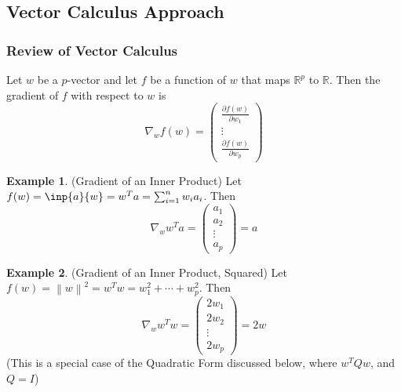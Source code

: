 \documentclass[12pt]{article}
\theoremstyle{definition}
\newtheorem{example}{Example}
\newcommand{\R}{\mathbb{R}}
\newcommand{\norm}[1]{\left\lVert#1\right\rVert}
\begin{document}
\subsection{Vector Calculus Approach}
\subsubsection{Review of Vector Calculus}
Let $w$ be a $p$-vector and let $f$ be a function of $w$ that maps $\R^p$ to $\R$. Then the gradient of $f$ with respect to $w$ is
\begin{equation}
	\nabla_w f(w) = \begin{pmatrix} \frac{\partial f(w)}{\partial w_1} \\ \vdots \\ \frac{\partial f(w)}{\partial w_p} \end{pmatrix}
\end{equation}

\begin{example}(Gradient of an Inner Product)
Let $f(w) = \inp{a}{w} = w^T a = \sum_{i=1}^n w_i a_i$. Then
\begin{equation}
	\nabla_w w^T a = \begin{pmatrix} a_1 \\ a_2 \\ \vdots \\ a_p \end{pmatrix} = a
\end{equation}
\end{example}

\begin{example}(Gradient of an Inner Product, Squared)
Let $f(w) = \norm{w}^2 = w^T w = w_1^2 + \cdots + w_p^2$. Then 
\begin{equation}
	\nabla_w w^T w = \begin{pmatrix} 2w_1 \\ 2w_2 \\ \vdots \\ 2w_p \end{pmatrix} = 2w
\end{equation}
(This is a special case of the Quadratic Form discussed below, where $w^TQw$, and $Q=I$)
\end{example}
\end{document}
